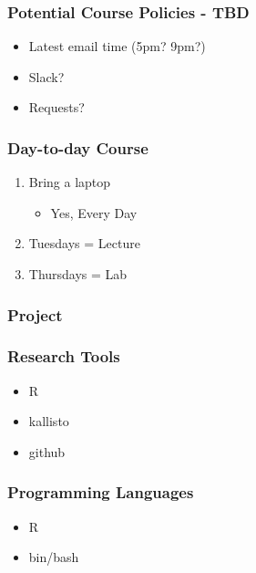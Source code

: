 \documentclass{beamer}
\begin{document}
\begin{frame}
\frametitle{Potential Course Policies - TBD}
\begin{itemize}
\item<1-> Latest email time (5pm? 9pm?)
\item<2-> Slack?
\item<3-> Requests?
\end{itemize}


\end{frame}

\begin{frame}
\frametitle{Day-to-day Course}
\begin{enumerate}
\item<1-> Bring a laptop
\begin{itemize}
	\item<2-> Yes, Every Day
\end{itemize}
\item<3-> Tuesdays = Lecture
\item<4-> Thursdays = Lab
\end{enumerate}
\end{frame}
\begin{frame}
\frametitle{Project}
\end{frame}
\begin{frame}
\frametitle{Research Tools}
\begin{itemize}
	\item R
	\item kallisto
	\item github
\end{itemize}
\end{frame}
\begin{frame}
\frametitle{Programming Languages}
\begin{itemize}
	\item R
	\item bin/bash
\end{itemize}
\end{frame}
\end{document}
